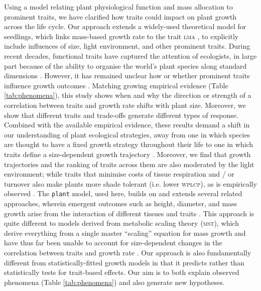 \documentclass[9pt,twocolumn,twoside,lineno]{pnas-new}
\newcommand{\plant}{\texttt{plant}}
\newcommand{\lma}{\textsc{lma}}
\begin{document}
Using a model relating plant physiological function and mass allocation to prominent traits, we have clarified how traits could impact on plant growth across the life cycle. Our approach extends a widely-used theoretical model for seedlings, which links mass-based growth rate to the trait {\lma} \citep{Lambers-1992, Wright-2000}, to explicitly include influences of size, light environment, and other prominent traits. During recent decades, functional traits have captured the attention of ecologists, in large part because of the ability to organise the world's plant species along standard dimensions \citep{Westoby-2002}. However, it has remained unclear how or whether prominent traits influence growth outcomes \citep{Poorter-2008, Wright-2010,Paine-2015}. Matching growing empirical evidence (Table \ref{tab:phenomena}), this study shows when and why the direction or strength of a correlation between traits and growth rate shifts with plant size. Moreover, we show that different traits and trade-offs generate different types of response. Combined with the available empirical evidence, these results demand a shift in our understanding of plant ecological strategies, away from one in which species are thought to have a fixed growth strategy throughout their life \citep[e.g.][]{Grime-1977, Adler-2014, Paine-2015} to one in which traits define a size-dependent growth trajectory \citep{Gibert-2016}. Moreover, we find that growth trajectories and the ranking of traits across them are also moderated by the light environment; while traits that minimise costs of tissue respiration and / or turnover also make plants more shade tolerant (i.e. lower \textsc{wplcp}), as is empirically observed \citep{Messier-1999, Craine-2005, Poorter-2006, Baltzer-2007, Lusk-2008}. The {\plant} model, used here, builds on and extends several related approaches, wherein emergent outcomes such as height, diameter, and mass growth arise from the interaction of different tissues and traits \citep[e.g.][]{Givnish-1988, Makela-1997, Moorcroft-2001}. This approach is quite different to models derived from metabolic scaling theory (\textsc{mst}), which derive everything from a single master ``scaling'' equation for mass growth and have thus far been unable to account for size-dependent changes in the correlation between traits and growth rate \citep{Enquist-1999, Enquist-2007}. Our approach is also fundamentally different from statistically-fitted growth models \citep[e.g.][]{Herault-2011, Ruger-2012, Iida-2014} in that it predicts rather than statistically tests for trait-based effects. Our aim is to both explain observed phenomena (Table \ref{tab:phenomena}) and also generate new hypotheses.
\end{document}
